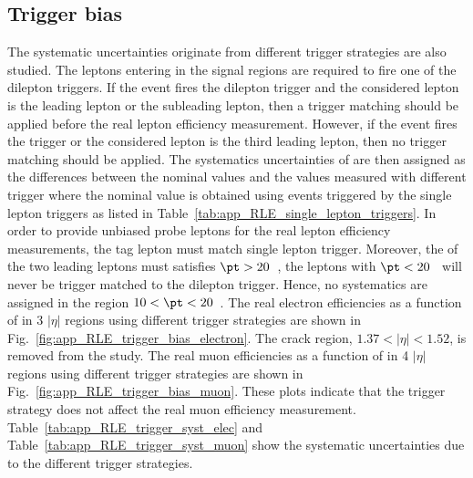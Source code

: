 \subsection{Trigger bias}
\label{subsec:app_RLE_trigger_bias}
The systematic uncertainties originate from different trigger strategies are also studied.
The leptons entering in the signal regions are required to fire one of the dilepton triggers.
If the event fires the dilepton trigger and the considered lepton is the leading lepton or the subleading lepton, then a trigger matching should be applied before the real lepton efficiency measurement.
However, if the event fires the \met trigger or the considered lepton is the third leading lepton, then no trigger matching should be applied.
The systematics uncertainties of are then assigned as the differences between the nominal values and the values measured with different trigger where the nominal value is obtained using events triggered by the single lepton triggers as listed in Table~\ref{tab:app_RLE_single_lepton_triggers}.
In order to provide unbiased probe leptons for the real lepton efficiency measurements, the tag lepton must match single lepton trigger.
Moreover, the \pt of the two leading leptons must satisfies $\pt > 20$~{\GeV}, the leptons with $\pt < 20$~{\GeV} will never be trigger matched to the dilepton trigger.
Hence, no systematics are assigned in the region $10 < \pt < 20$~{\GeV}.
The real electron efficiencies as a function of \pt in 3 $|\eta|$ regions using different trigger strategies are shown in Fig.~\ref{fig:app_RLE_trigger_bias_electron}.
The crack region, $1.37<|\eta|<1.52$, is removed from the study.
The real muon efficiencies as a function of \pt in 4 $|\eta|$ regions using different trigger strategies are shown in Fig.~\ref{fig:app_RLE_trigger_bias_muon}.
These plots indicate that the trigger strategy does not affect the real muon efficiency measurement.
Table~\ref{tab:app_RLE_trigger_syst_elec} and Table~\ref{tab:app_RLE_trigger_syst_muon} show the systematic uncertainties due to the different trigger strategies.

